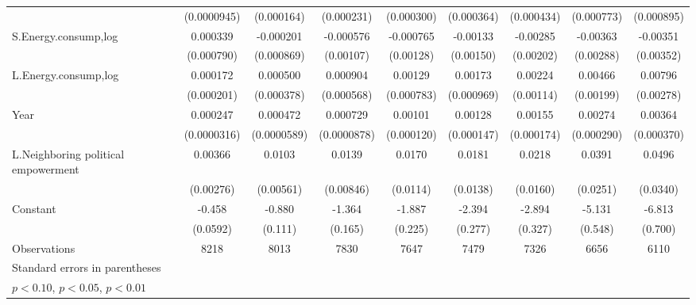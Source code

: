 \begin{table}[htbp]
\begin{tabular}{l*{8}{c}}
                    & (0.0000945)         &  (0.000164)         &  (0.000231)         &  (0.000300)         &  (0.000364)         &  (0.000434)         &  (0.000773)         &  (0.000895)         \\
[1em]
S.Energy.consump,log&    0.000339         &   -0.000201         &   -0.000576         &   -0.000765         &    -0.00133         &    -0.00285         &    -0.00363         &    -0.00351         \\
                    &  (0.000790)         &  (0.000869)         &   (0.00107)         &   (0.00128)         &   (0.00150)         &   (0.00202)         &   (0.00288)         &   (0.00352)         \\
[1em]
L.Energy.consump,log&    0.000172         &    0.000500         &    0.000904         &     0.00129         &     0.00173\sym{*}  &     0.00224\sym{*}  &     0.00466\sym{**} &     0.00796\sym{***}\\
                    &  (0.000201)         &  (0.000378)         &  (0.000568)         &  (0.000783)         &  (0.000969)         &   (0.00114)         &   (0.00199)         &   (0.00278)         \\
[1em]
Year                &    0.000247\sym{***}&    0.000472\sym{***}&    0.000729\sym{***}&     0.00101\sym{***}&     0.00128\sym{***}&     0.00155\sym{***}&     0.00274\sym{***}&     0.00364\sym{***}\\
                    & (0.0000316)         & (0.0000589)         & (0.0000878)         &  (0.000120)         &  (0.000147)         &  (0.000174)         &  (0.000290)         &  (0.000370)         \\
[1em]
L.Neighboring political empowerment&     0.00366         &      0.0103\sym{*}  &      0.0139         &      0.0170         &      0.0181         &      0.0218         &      0.0391         &      0.0496         \\
                    &   (0.00276)         &   (0.00561)         &   (0.00846)         &    (0.0114)         &    (0.0138)         &    (0.0160)         &    (0.0251)         &    (0.0340)         \\
[1em]
Constant            &      -0.458\sym{***}&      -0.880\sym{***}&      -1.364\sym{***}&      -1.887\sym{***}&      -2.394\sym{***}&      -2.894\sym{***}&      -5.131\sym{***}&      -6.813\sym{***}\\
                    &    (0.0592)         &     (0.111)         &     (0.165)         &     (0.225)         &     (0.277)         &     (0.327)         &     (0.548)         &     (0.700)         \\
\hline
Observations        &        8218         &        8013         &        7830         &        7647         &        7479         &        7326         &        6656         &        6110         \\
\hline\hline
\multicolumn{9}{l}{\footnotesize Standard errors in parentheses}\\
\multicolumn{9}{l}{\footnotesize \sym{*} \(p<0.10\), \sym{**} \(p<0.05\), \sym{***} \(p<0.01\)}\\
\end{tabular}
\end{table}
